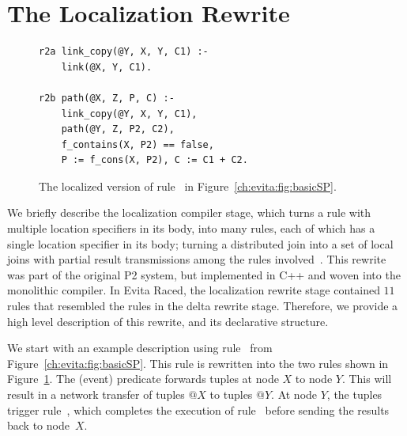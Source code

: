 \section{The Localization Rewrite}
\label{ch:evita:sec:local}

\begin{figure}[!t]
\ssp
\centering
\begin{lstlisting}
r2a link_copy(@Y, X, Y, C1) :-
    link(@X, Y, C1).

r2b path(@X, Z, P, C) :-
    link_copy(@Y, X, Y, C1), 
    path(@Y, Z, P2, C2),
    f_contains(X, P2) == false,
    P := f_cons(X, P2), C := C1 + C2.
\end{lstlisting}
\caption{\label{ch:evita:fig:basicSPLocal}The localized version of rule~ in
Figure~\ref{ch:evita:fig:basicSP}.}
\end{figure}

We briefly describe the localization compiler stage, which turns a rule with
multiple location specifiers in its body, into many rules, each of which has a
single location specifier in its body; turning a distributed join into a set of
local joins with partial result transmissions among the rules
involved~\cite{loo-sigmod06}.  This rewrite was part of the original P2 system,
but implemented in C++ and woven into the monolithic compiler.  In Evita Raced,
the localization rewrite stage contained $11$ rules that resembled the rules in
the delta rewrite stage.  Therefore, we provide a high level description of
this rewrite, and its declarative structure.

We start with an example description using rule~ from
Figure~\ref{ch:evita:fig:basicSP}.  This rule is rewritten into the two rules
shown in Figure~\ref{ch:evita:fig:basicSPLocal}.  The  (event)
predicate forwards  tuples at node $X$ to node $Y$.  This will result
in a network transfer of  tuples $@X$ to  tuples $@Y$.
At node $Y$, the  tuples trigger rule~, which completes
the execution of rule~ before sending the  results back to
node~$X$.

